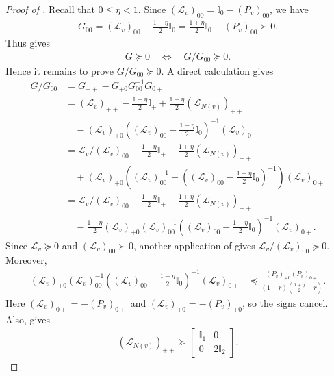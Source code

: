 \documentclass[a4paper,12pt]{article}
\theoremstyle{plain}
\theoremstyle{definition}
\def\+#1{\mathcal{#1}} %
\def\+#1{\mathcal{#1}} %
\newcommand{\tuple}[1]{\left(#1\right)}
\newcommand{\tp}{\tuple}
\begin{document}
\begin{proof}[Proof of ]
Recall that $0\leq\eta<1$.
Since $(\+L_v)_{00}=\mathbb{I}_0-(P_v)_{00}$, we have
\begin{align*}
  G_{00}=(\+L_v)_{00}-\frac{1-\eta}{2}\mathbb{I}_0
  =\frac{1+\eta}{2}\mathbb{I}_0-(P_v)_{00}\succ0.
\end{align*}
Thus  gives
\begin{align*}
  G \succeq 0 \quad \Longleftrightarrow \quad G/G_{00} \succeq 0.
\end{align*}
Hence it remains to prove $G/G_{00}\succeq0$.  A direct calculation gives
\begin{align*}
  G/G_{00}
  &= G_{++} - G_{+0}G_{00}^{-1}G_{0+} \\
  &= (\+L_v)_{++} - \frac{1-\eta}{2}\mathbb{I}_+
     + \frac{1+\eta}{2} (\+L_{N(v)})_{++} \\
  &\quad - (\+L_v)_{+0}
    \tp{(\+L_v)_{00} - \frac{1-\eta}{2}\mathbb{I}_0}^{-1}
    (\+L_v)_{0+} \\
  &= \+L_v/(\+L_v)_{00} - \frac{1-\eta}{2}\mathbb{I}_+ + \frac{1+\eta}{2} (\+L_{N(v)})_{++} \\
  &\quad + (\+L_v)_{+0}\left((\+L_v)_{00}^{-1}
    - \tp{(\+L_v)_{00} - \frac{1-\eta}{2}\mathbb{I}_0}^{-1}\right)
    (\+L_v)_{0+} \\
  &= \+L_v/(\+L_v)_{00} - \frac{1-\eta}{2}\mathbb{I}_+ + \frac{1+\eta}{2} (\+L_{N(v)})_{++} \\
  &\quad - \frac{1-\eta}{2} (\+L_v)_{+0}(\+L_v)_{00}^{-1}
    \tp{(\+L_v)_{00} - \frac{1-\eta}{2}\mathbb{I}_0}^{-1}
    (\+L_v)_{0+}.
\end{align*}
Since $\+L_v\succeq0$ and $(\+L_v)_{00}\succ0$, another application of
 gives
$\+L_v/(\+L_v)_{00}\succeq0$.  Moreover,
\begin{align*}
  (\+L_v)_{+0}(\+L_v)_{00}^{-1}
  \tp{(\+L_v)_{00} - \frac{1-\eta}{2}\mathbb{I}_0}^{-1}
  (\+L_v)_{0+}
  &\preceq
  \frac{(P_v)_{+0}(P_v)_{0+}}
  {(1-r)(\frac{1+\eta}{2}-r)}.
\end{align*}
Here $(\+L_v)_{0+}=-(P_v)_{0+}$ and
$(\+L_v)_{+0}=-(P_v)_{+0}$, so the signs cancel.  Also,
 gives
\begin{align*}
  (\+L_{N(v)})_{++} \succeq
  \begin{bmatrix}
    \mathbb{I}_1 & 0 \\
    0 & 2 \mathbb{I}_2
  \end{bmatrix}.
\end{align*}

\end{proof}
\end{document}
